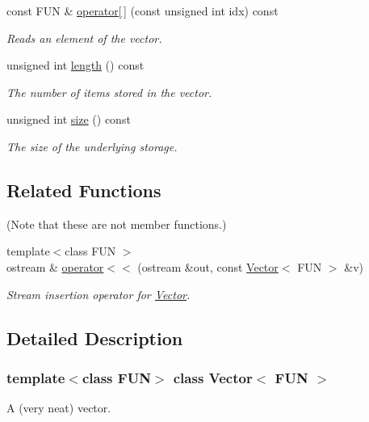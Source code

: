\begin{DoxyCompactItemize}
const F\+UN \& \hyperlink{classVector_a3e0e1eb0aea867284f13efb6bc21f2bf}{operator\mbox{[}$\,$\mbox{]}} (const unsigned int idx) const
\begin{DoxyCompactList}\small\item\em Reads an element of the vector. \end{DoxyCompactList}\item 
unsigned int \hyperlink{classVector_ab89f11fa1d0aadc25484f4971f16f38a}{length} () const
\begin{DoxyCompactList}\small\item\em The number of items stored in the vector. \end{DoxyCompactList}\item 
unsigned int \hyperlink{classVector_a21b80c989eadd6dfa49f2c01e53abd35}{size} () const
\begin{DoxyCompactList}\small\item\em The size of the underlying storage. \end{DoxyCompactList}\end{DoxyCompactItemize}
\subsection*{Related Functions}
(Note that these are not member functions.) \begin{DoxyCompactItemize}
\item 
{\footnotesize template$<$class F\+UN $>$ }\\ostream \& \hyperlink{classVector_acdb80390f6795111ddcd4ab48dc902b2}{operator$<$$<$} (ostream \&out, const \hyperlink{classVector}{Vector}$<$ F\+UN $>$ \&v)
\begin{DoxyCompactList}\small\item\em Stream insertion operator for {\ttfamily \hyperlink{classVector}{Vector}}. \end{DoxyCompactList}\end{DoxyCompactItemize}


\subsection{Detailed Description}
\subsubsection*{template$<$class F\+UN$>$\newline
class Vector$<$ F\+U\+N $>$}

A (very neat) vector. 

